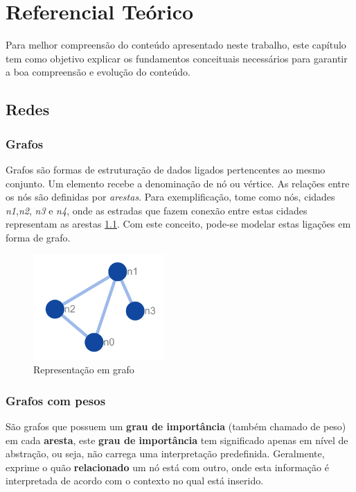 \chapter{Referencial Teórico}

	 
\par
    Para melhor compreensão do conteúdo apresentado neste trabalho, este capítulo tem como objetivo explicar os fundamentos conceituais necessários para garantir a boa compreensão e evolução do conteúdo.
    
\section{Redes}

\subsection{Grafos}
Grafos são formas de estruturação de dados ligados pertencentes ao mesmo conjunto. Um elemento recebe a denominação de nó ou vértice. As relações entre os nós são definidas por \textit{arestas}.
Para exemplificação, tome como nós, cidades \textit{n1},\textit{n2}, \textit{n3} e \textit{n4}, onde as estradas que fazem conexão entre estas cidades representam as arestas \ref{graph_base}. Com este conceito, pode-se modelar estas ligações em forma de grafo. \cite{Graph_teory}
%
\begin{figure}[ht!]
\centering
\includegraphics[width=50mm]{Images/graph_base.png}
\caption {Representação em grafo
\label{graph_base}}
\end{figure}


\subsection{Grafos com pesos}
São grafos que possuem um \textbf{grau de importância} (também chamado de peso) em cada \textbf{aresta}, este \textbf{grau de importância} tem significado apenas em nível de abstração, ou seja, não carrega uma interpretação predefinida. Geralmente, exprime o quão \textbf{relacionado} um nó está com outro, onde esta informação é interpretada de acordo com o contexto no qual está inserido.\cite{Graph_teory}

